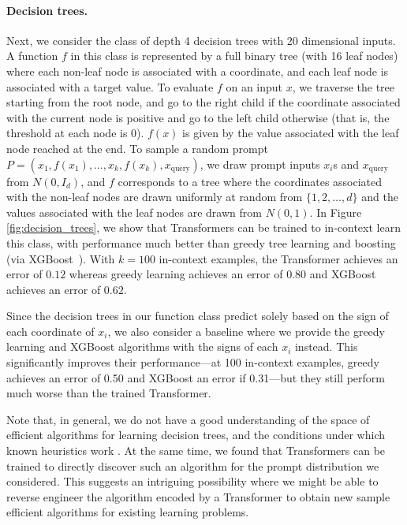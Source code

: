 \paragraph{Decision trees.} 
Next, we consider the class of depth 4 decision trees with 20 dimensional inputs. A function $f$ in this class is represented by a full binary tree (with 16 leaf nodes) where each non-leaf node is associated with a coordinate, and each leaf node is associated with a target value. To evaluate $f$ on an input $x$, we traverse the tree starting from the root node, and go to the right child if the coordinate associated with the current node is positive and go to the left child otherwise (that is, the threshold at each node is $0$). $f(x)$ is given by the value associated with the leaf node reached at the end. To sample a  random prompt $P = (x_1, f(x_1), \ldots, x_k, f(x_k), x_\text{query})$, we draw prompt inputs $x_i$s and $x_\text{query}$ from $N(0, I_d)$, and $f$ corresponds to a tree where the coordinates associated with the non-leaf nodes are drawn uniformly at random from $\{1, 2,  \ldots, d\}$ and the values associated with the leaf nodes are drawn from $N(0, 1)$. 
In Figure \ref{fig:decision_trees}, we show that Transformers can be trained to in-context learn this class, with performance much better than  greedy tree learning and boosting (via XGBoost~\citep{chen2016xgboost}).
With $k=100$ in-context examples, the Transformer achieves an error of $0.12$ whereas greedy learning achieves an error of $0.80$ and XGBoost achieves an error of $0.62$.

Since the decision trees in our function class predict solely based on the sign of each coordinate of $x_i$, we also consider a baseline where we provide the greedy learning and XGBoost algorithms with the signs of each $x_i$ instead. %
This significantly improves their performance---at 100 in-context examples, greedy achieves an error of 0.50 and XGBoost an error if 0.31---but they still perform much worse than the trained Transformer.

Note that, in general, we do not have a good understanding of the space of efficient algorithms for learning decision trees, and the conditions under which known heuristics work \citep{blanc2021decision, brutzkus2020id3}.
At the same time, we found that Transformers can be trained to directly discover such an algorithm for the prompt distribution we considered. This suggests an intriguing possibility where we might be able to reverse engineer the algorithm encoded by a Transformer to obtain new sample efficient algorithms for existing learning problems. 

